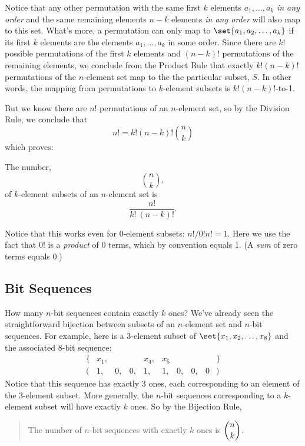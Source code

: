 Notice that any other permutation with the same first $k$ elements
$a_1,\dots,a_k$ \emph{in any order} and the same remaining elements $n-k$
elements \emph{in any order} will also map to this set.  What's more, a
permutation can only map to $\set{a_1,a_2,\dots,a_k}$ if its first $k$
elements are the elements $a_1,\dots,a_k$ in some order.  Since there are
$k!$ possible permutations of the first $k$ elements and $(n-k)!$
permutations of the remaining elements, we conclude from the Product Rule
that exactly $k!(n-k)!$ permutations of the $n$-element set map to the the
particular subset, $S$.  In other words, the mapping from permutations to
$k$-element subsets is $k!(n-k)!$-to-1.

But we know there are $n!$ permutations of an $n$-element set, so by the
Division Rule, we conclude that
\[
n!= k!(n-k)!\binom{n}{k}
\]
which proves:
\begin{mathrule}
\label{rule:subset}
The number,
\[
\binom{n}{k},
\]
of $k$-element subsets of an $n$-element set is
\[
\frac{n!}{k!\ (n-k)!}.
\]
\end{mathrule}

Notice that this works even for 0-element subsets: $n!/0!n! = 1$.  Here we
use the fact that $0!$ is a \emph{product} of 0 terms, which by convention
equals 1.  (A \emph{sum} of zero terms equals 0.)

\subsection{Bit Sequences}

How many $n$-bit sequences contain exactly $k$ ones?  We've already seen
the straightforward bijection between subsets of an $n$-element set and
$n$-bit sequences.  For example, here is a 3-element subset of $\set{x_1,
x_2, \ldots, x_8}$ and the associated 8-bit sequence:
%
\[
\begin{array}{rccccccccl}
\{ & x_1, &    &    & x_4, & x_5  &    &    &   & \} \\
(  &   1, & 0, & 0, &   1, &   1, & 0, & 0, & 0 & )
\end{array}
\]
Notice that this sequence has exactly 3 ones, each corresponding to an
element of the 3-element subset.  More generally, the $n$-bit sequences
corresponding to a $k$-element subset will have exactly $k$ ones.  So by
the Bijection Rule,
\begin{quote}
The number of $n$-bit sequences with exactly $k$ ones is $\dbinom{n}{k}$.
\end{quote}

